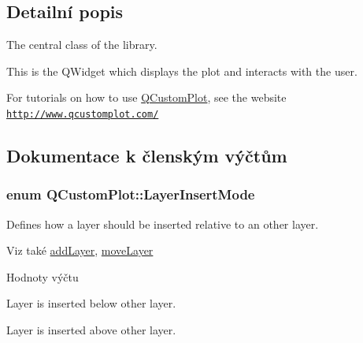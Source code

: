 \subsection{Detailní popis}
The central class of the library. 

This is the Q\+Widget which displays the plot and interacts with the user.

For tutorials on how to use \hyperlink{classQCustomPlot}{Q\+Custom\+Plot}, see the website~\newline
\href{http://www.qcustomplot.com/}{\tt http\+://www.\+qcustomplot.\+com/} 

\subsection{Dokumentace k členským výčtům}
\hypertarget{classQCustomPlot_a75a8afbe6ef333b1f3d47abb25b9add7}{}
\subsubsection[{Layer\+Insert\+Mode}]{\setlength{\rightskip}{0pt plus 5cm}enum {\bf Q\+Custom\+Plot\+::\+Layer\+Insert\+Mode}}\label{classQCustomPlot_a75a8afbe6ef333b1f3d47abb25b9add7}


Defines how a layer should be inserted relative to an other layer. 

\begin{DoxySeeAlso}{Viz také}
\hyperlink{classQCustomPlot_ad5255393df078448bb6ac83fa5db5f52}{add\+Layer}, \hyperlink{classQCustomPlot_ae896140beff19424e9e9e02d6e331104}{move\+Layer} 
\end{DoxySeeAlso}
\begin{Desc}
\item[Hodnoty výčtu]\par
\begin{description}
\item[{\em 
\hypertarget{classQCustomPlot_a75a8afbe6ef333b1f3d47abb25b9add7aee39cf650cd24e68552da0b697ce4a93}{}lim\+Below\label{classQCustomPlot_a75a8afbe6ef333b1f3d47abb25b9add7aee39cf650cd24e68552da0b697ce4a93}
}]Layer is inserted below other layer. \item[{\em 
\hypertarget{classQCustomPlot_a75a8afbe6ef333b1f3d47abb25b9add7a062b0b7825650b432a713c0df6742d41}{}lim\+Above\label{classQCustomPlot_a75a8afbe6ef333b1f3d47abb25b9add7a062b0b7825650b432a713c0df6742d41}
}]Layer is inserted above other layer. \end{description}
\end{Desc}
\hypertarget{classQCustomPlot_a45d61392d13042e712a956d27762aa39}{}
